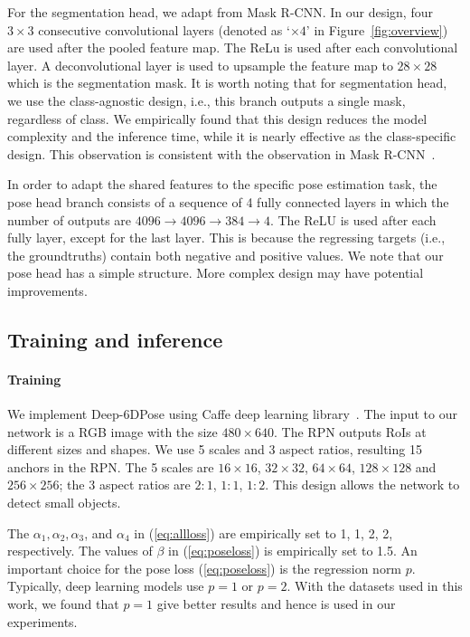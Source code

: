 \documentclass[conference]{IEEEtran}
\newcommand{\method}[1]{Deep-6DPose}
\begin{document}
For the segmentation head, we adapt from Mask R-CNN. In our design, four $3\times3$ consecutive convolutional layers (denoted as `$\times4$' in Figure~\ref{fig:overview}) are used after the pooled feature map. The ReLu is used after each convolutional layer. A deconvolutional layer is used to upsample the feature map to $28\times28$ which is the segmentation mask. It is worth noting that for segmentation head, we use the class-agnostic design, i.e., this branch outputs a single mask, regardless of class. We empirically found that this design reduces the model complexity and the inference time, while it is nearly effective as the class-specific design. This observation is consistent with the observation in Mask R-CNN~\cite{Mask-RCNN}. 

In order to adapt the shared features to the specific pose estimation task, the pose head branch consists of a sequence of 4 fully connected layers in which the number of outputs are $4096 \to 4096 \to 384 \to 4$.  The ReLU is used after each fully layer, except for the last layer. This is because the regressing targets (i.e., the groundtruths) contain both negative and positive values. We note that our pose head has a simple structure. More complex design may have potential improvements. 

\subsection{Training and inference}\paragraph{Training}
We implement \method{} using Caffe deep learning library~\cite{DBLP:conf/mm/JiaSDKLGGD14}. The input to our network is a RGB image with the size $480 \times 640$. 
The RPN outputs RoIs at different sizes and shapes. We use 5 scales and 3 aspect ratios, resulting 15 anchors in the RPN. The 5 scales are $16 \times 16$, $32\times32$, $64 \times 64$, $128\times128$ and $256 \times 256$; the 3 aspect ratios are $2:1$, $1:1$, $1:2$. This design allows the network to detect small objects. 

The $\alpha_1, \alpha_2, \alpha_3$, and $\alpha_4$ in (\ref{eq:allloss}) are empirically set to 1, 1, 2, 2, respectively. The values of $\beta$ in (\ref{eq:poseloss}) is empirically set to 1.5. 
An important choice for the pose loss (\ref{eq:poseloss}) is the regression norm $p$. Typically, deep learning models use $p=1$ or $p=2$. With the datasets used in this work, we found that $p=1$ give better results and hence is used in our experiments. 
\end{document}

